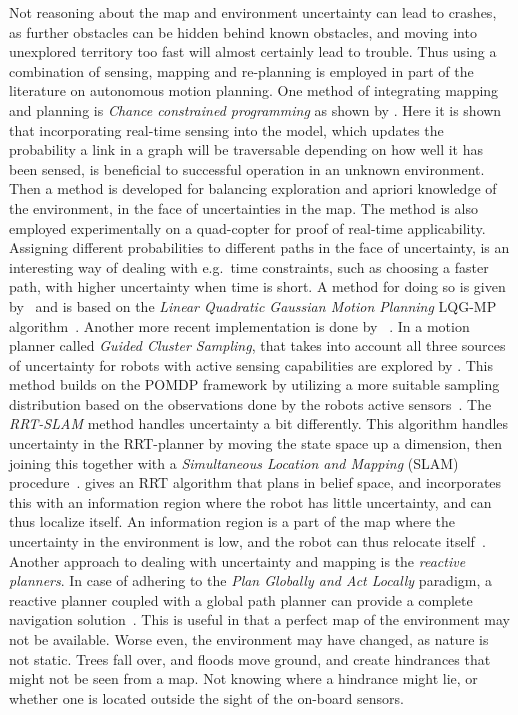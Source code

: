 Not reasoning about the map and environment uncertainty can lead to crashes, as
further obstacles can be hidden behind known obstacles, and moving into
unexplored territory too fast will almost certainly lead to trouble. Thus using
a combination of sensing, mapping and re-planning is employed in part of the
literature on autonomous motion planning. One method of integrating mapping and
planning is \textit{Chance constrained programming } as shown by
\textcite{vitusHierarchicalMethodStochastic2012}. Here it is shown that
incorporating real-time sensing into the model, which updates the probability a
link in a graph will be traversable depending on how well it has been sensed, is
beneficial to successful operation in an unknown environment. Then a method is
developed for balancing exploration and apriori knowledge of the environment, in
the face of uncertainties in the map. The method is also employed experimentally
on a quad-copter for proof of real-time applicability. Assigning different
probabilities to different paths in the face of uncertainty, is an interesting
way of dealing with e.g.\ time constraints, such as choosing a faster path, with
higher uncertainty when time is short. A method for doing so is given
by~\citeauthor{vandenbergLQGMPOptimizedPath2011} and is based on the
\textit{Linear Quadratic Gaussian Motion Planning} LQG-MP
algorithm~\cite{vandenbergLQGMPOptimizedPath2011}. Another more recent
implementation is done by
\citeauthor{blakeEfficientComputationCollision2018}~\cite{blakeEfficientComputationCollision2018}.
In a motion planner called \textit{Guided Cluster Sampling}, that takes into
account all three sources of uncertainty for robots with active sensing
capabilities are explored by \citeauthor{Kurniawati_2011}. This method builds on
the POMDP framework by utilizing a more suitable sampling distribution based on
the observations done by the robots active sensors~\cite{Kurniawati_2011}. The
\textit{RRT-SLAM} method handles uncertainty a bit differently. This algorithm
handles uncertainty in the RRT-planner by moving the state space up a dimension,
then joining this together with a \textit{Simultaneous Location and Mapping}
(SLAM) procedure~\cite{huangRRTSLAMMotionPlanning2008}.
\citeauthor{bryRapidlyexploringRandomBelief2011} gives an RRT algorithm that
plans in belief space, and incorporates this with an information region where
the robot has little uncertainty, and can thus localize itself. An information
region is a part of the map where the uncertainty in the environment is low, and
the robot can thus relocate itself~\cite{bryRapidlyexploringRandomBelief2011}.
Another approach to dealing with uncertainty and mapping is the \textit{reactive
  planners}. In case of adhering to the \textit{Plan Globally and Act Locally}
paradigm, a reactive planner coupled with a global path planner can provide a
complete navigation solution~\cite{djekouneSensorBasedNavigation2009}. This is
useful in that a perfect map of the environment may not be available. Worse
even, the environment may have changed, as nature is not static. Trees fall
over, and floods move ground, and create hindrances that might not be seen from
a map. Not knowing where a hindrance might lie, or whether one is located
outside the sight of the on-board sensors.

